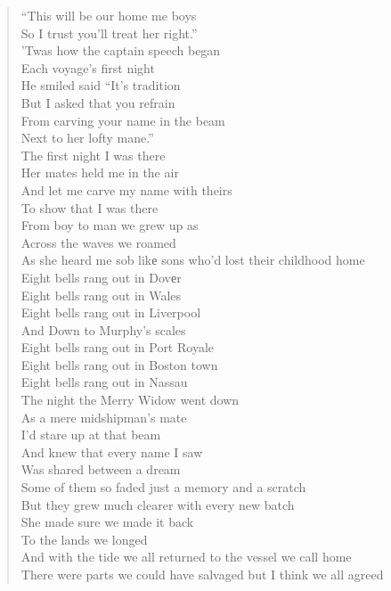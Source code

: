 \documentclass[11pt]{article}
\begin{document}
\begin{verse}
``This will be our home me boys\\
So I trust you'll treat her right.''\\
'Twas how the captain speech began\\
Each voyage's first night\\
He smiled said ``It's tradition\\
But I asked that you refrain\\
From carving your name in the beam\\
Next to her lofty mane.''\\
\vspace*{1em}
The first night I was there\\
Her mates held me in the air\\
And let me carve my name with theirs\\
To show that I was there\\
From boy to man we grew up as\\
Across the waves we roamed\\
As she heard me sob likе sons who'd lost their childhood home\\
Eight bells rang out in Dovеr\\
Eight bells rang out in Wales\\
Eight bells rang out in Liverpool\\
And Down to Murphy's scales\\
Eight bells rang out in Port Royale\\
Eight bells rang out in Boston town\\
Eight bells rang out in Nassau\\
The night the Merry Widow went down\\
\vspace*{1em}
As a mere midshipman's mate\\
I'd stare up at that beam\\
And knew that every name I saw\\
Was shared between a dream\\
Some of them so faded just a memory and a scratch\\
But they grew much clearer with every new batch\\
She made sure we made it back\\
To the lands we longed\\
And with the tide we all returned to the vessel we call home\\
There were parts we could have salvaged but I think we all agreed\\

\end{verse}
\end{document}
